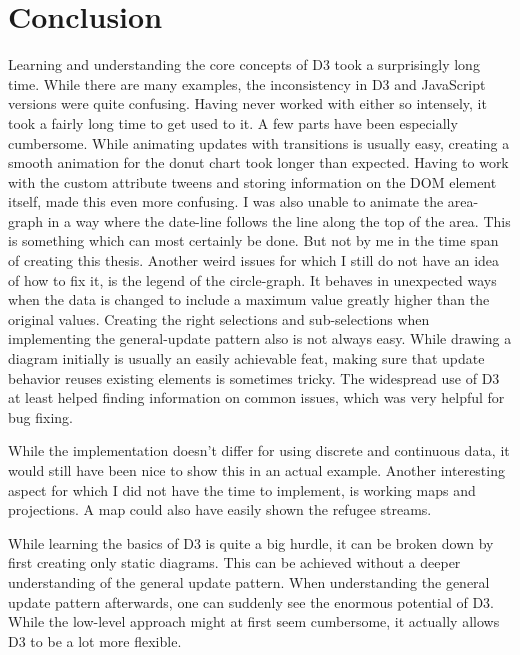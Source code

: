 \chapter{Conclusion}

Learning and understanding the core concepts of D3 took a surprisingly long time. While there are many examples, the inconsistency in D3 and JavaScript versions were quite confusing. Having never worked with either so intensely, it took a fairly long time to get used to it. A few parts have been especially cumbersome. While animating updates with transitions is usually easy, creating a smooth animation for the donut chart took longer than expected. Having to work with the custom attribute tweens and storing information on the DOM element itself, made this even more confusing. I was also unable to animate the area-graph in a way where the date-line follows the line along the top of the area. This is something which can most certainly be done. But not by me in the time span of creating this thesis. Another weird issues for which I still do not have an idea of how to fix it, is the legend of the circle-graph. It behaves in unexpected ways when the data is changed to include a maximum value greatly higher than the original values.
Creating the right selections and sub-selections when implementing the general-update pattern also is not always easy. While drawing a diagram initially is usually an easily achievable feat, making sure that update behavior reuses existing elements is sometimes tricky. The widespread use of D3 at least helped finding information on common issues, which was very helpful for bug fixing.

While the implementation doesn't differ for using discrete and continuous data, it would still have been nice to show this in an actual example. Another interesting aspect for which I did not have the time to implement, is working maps and projections. A map could also have easily shown the refugee streams.

While learning the basics of D3 is quite a big hurdle, it can be broken down by first creating only static diagrams. This can be achieved without a deeper understanding of the general update pattern. When understanding the general update pattern afterwards, one can suddenly see the enormous potential of D3. While the low-level approach might at first seem cumbersome, it actually allows D3 to be a lot more flexible. 

